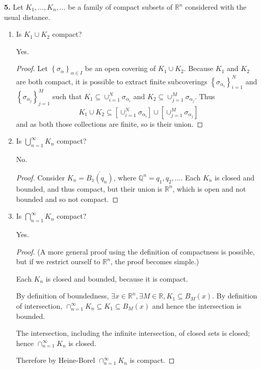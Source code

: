 \documentclass{article}
\newcommand{\R}{\mathbb{R}}
\newcommand{\Q}{\mathbb{Q}}
\newcommand{\set}[1]{\left\{ #1 \right\}}
\newcommand{\brac}[1]{\left[ #1 \right]}
\newcommand{\ol}[1]{\overline{#1}}
\begin{document}
\newpage %


\textbf{5. } %
Let $K_1, \dots, K_n, \dots$ be a family of compact subsets of $\R^n$ considered with the usual distance.
\begin{enumerate}
    \item  %
    Is $K_1 \cup K_2$ compact?

    Yes.
    \begin{proof}
        Let $\set{\sigma_\alpha}_{\alpha \in I}$ be an open covering of $K_1 \cup K_2$. Because $K_1$ and $K_2$ are both compact, it is possible to extract finite subcoverings $\set{\sigma_{\alpha_i}}_{i = 1}^N$ and $\set{\sigma_{\alpha_j}}_{j = 1}^M$ such that $\displaystyle K_1 \subseteq \cup_{i = 1}^N \sigma_{\alpha_i}$ and $\displaystyle K_2 \subseteq \cup_{j = 1}^M \sigma_{\alpha_j}$. Thus
        $$\displaystyle K_1 \cup K_2 \subseteq \brac{\cup_{i = 1}^N \sigma_{\alpha_i}} \cup \brac{\cup_{j = 1}^M \sigma_{\alpha_j}}$$
        and as both those collections are finite, so is their union.
    \end{proof}


    \item %
    Is $\bigcup_{n = 1}^\infty K_n$ compact?

    No.
    \begin{proof}
        Consider $K_n = \ol{B_1(q_n)}$, where $\Q^n = {q_1, q_2, \dots}$. Each $K_n$ is closed and bounded, and thus compact, but their union is $\R^n$, which is open and not bounded and so not compact.
        
    \end{proof}


    \item 
    Is $\bigcap_{n = 1}^\infty K_n$ compact?

    Yes.
    \begin{proof}
        (A more general proof using the definition of compactness is possible, but if we restrict ourself to $\R^n$, the proof becomes simple.)

        Each $K_n$ is closed and bounded, because it is compact.
        
        By definition of boundedness, $\exists x \in \R^n, \exists M \in \R, K_1 \subseteq B_M(x)$. By definition of intersection, $\cap_{n = 1}^\infty K_n \subseteq K_1 \subseteq B_M(x)$ and hence the intersection is bounded.

        The intersection, including the infinite intersection, of closed sets is closed; hence $\cap_{n = 1}^\infty K_n$ is closed.

        Therefore by Heine-Borel $\cap_{n = 1}^\infty K_n$ is compact.        
    \end{proof}
\end{enumerate}

\end{document}
